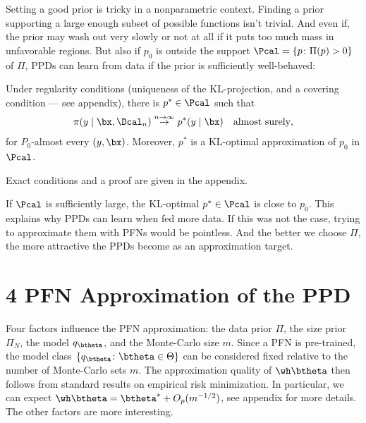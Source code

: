 \documentclass[aspectratio=169,10pt]{beamer}
\newcommand{\currentheading}{\ifx\insertsubsection\empty\insertsection\else\insertsubsection\fi}
\begin{document}
\begin{frame}{\currentheading}
Setting a good prior is tricky in a nonparametric context. Finding a prior supporting a large enough subset of possible functions isn't trivial. And even if, the prior may wash out very slowly or not at all if it puts too much mass in unfavorable regions. But also if $p_0$ is outside the support $\Pcal = \{p\colon \Pi(p) > 0\}$ of $\Pi$, PPDs can learn from data if the prior is sufficiently well-behaved:
\end{frame}

\begin{frame}{\currentheading}
\begin{theorem}[3.1]\label{thm:posterior-consistency}
Under regularity conditions (uniqueness of the KL-projection, and a covering condition --- see appendix), there is $p^* \in \Pcal$ such that
\begin{align*}
	 \pi(y\mid \bx, \Dcal_n)  \stackrel{n \to \infty}\rightarrow p^*(y \mid \bx) \quad \text{almost surely},
\end{align*}
for $P_0$-almost every $(y, \bx)$. Moreover, $p^*$ is a KL-optimal approximation of $p_0$ in $\Pcal$.
\end{theorem}
Exact conditions and a proof are given in the appendix.
\end{frame}

\begin{frame}{\currentheading}
If $\Pcal$ is sufficiently large, the KL-optimal $p^* \in \Pcal$ is close to $p_0$. This explains why PPDs can learn when fed more data. If this was not the case, trying to approximate them with PFNs would be pointless. And the better we choose $\Pi$, the more attractive the PPDs become as an approximation target.
\end{frame}

\section{4 PFN Approximation of the PPD}

\begin{frame}{\currentheading}
Four factors influence the PFN approximation: the data prior $\Pi$, the size prior $\Pi_N$, the model $q_{\btheta}$, and the Monte-Carlo size $m$. Since a PFN is pre-trained, the model class $\{q_{\btheta}\colon \btheta \in \Theta\}$ can be considered fixed relative to the number of Monte-Carlo sets $m$. The approximation quality of $\wh \btheta$ then follows from standard results on empirical risk minimization. In particular, we can expect $\wh \btheta = \btheta^* + O_p(m^{-1/2})$, see appendix for more details. The other factors are more interesting.
\end{frame}
\end{document}
